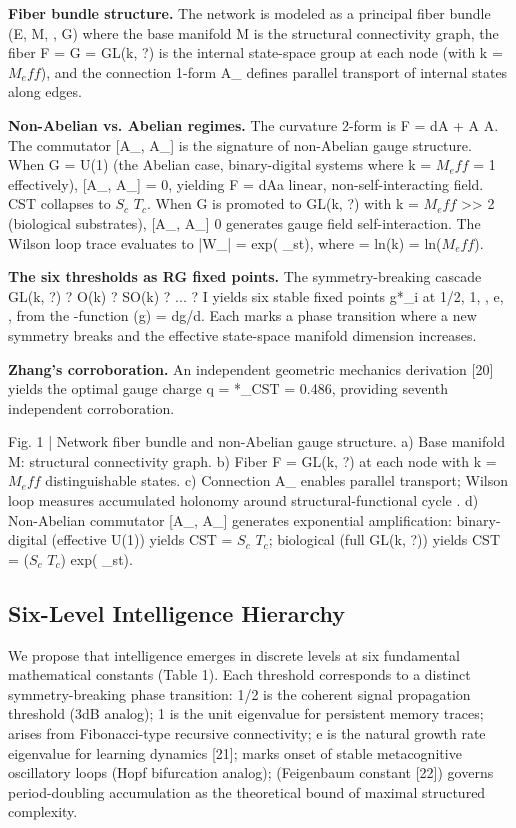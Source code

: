 \documentclass[a4paper,12pt]{article}
\begin{document}
\textbf{Fiber bundle structure.} The network is modeled as a principal fiber bundle (E, M, , G) where the base manifold M is the structural connectivity graph, the fiber F = G = GL(k, ?) is the internal state-space group at each node (with k = $M_eff$), and the connection 1-form A_ defines parallel transport of internal states along edges.


\textbf{Non-Abelian vs. Abelian regimes.} The curvature 2-form is F = dA + A  A. The commutator [A_, A_] is the signature of non-Abelian gauge structure. When G = U(1) (the Abelian case, binary-digital systems where k = $M_eff$ = 1 effectively), [A_, A_] = 0, yielding F = dAa linear, non-self-interacting field. CST collapses to $S_c$  $T_c$. When G is promoted to GL(k, ?) with k = $M_eff$ >> 2 (biological substrates), [A_, A_]  0 generates gauge field self-interaction. The Wilson loop trace evaluates to |W_| = exp(  _st), where  = ln(k) = ln($M_eff$).


\textbf{The six thresholds as RG fixed points.} The symmetry-breaking cascade GL(k, ?) ? O(k) ? SO(k) ? ... ? {I} yields six stable fixed points g*_i at {1/2, 1, , e, , } from the -function (g) =  dg/d. Each marks a phase transition where a new symmetry breaks and the effective state-space manifold dimension increases.


\textbf{Zhang's corroboration.} An independent geometric mechanics derivation [20] yields the optimal gauge charge q = *_CST = 0.486, providing seventh independent corroboration.





Fig. 1 | Network fiber bundle and non-Abelian gauge structure. a) Base manifold M: structural connectivity graph. b) Fiber F = GL(k, ?) at each node with k = $M_eff$ distinguishable states. c) Connection A_ enables parallel transport; Wilson loop measures accumulated holonomy around structural-functional cycle . d) Non-Abelian commutator [A_, A_] generates exponential amplification: binary-digital (effective U(1)) yields CST = $S_c$  $T_c$; biological (full GL(k, ?)) yields CST = ($S_c$  $T_c$)  exp(  _st).



\subsection{Six-Level Intelligence Hierarchy}

We propose that intelligence emerges in discrete levels at six fundamental mathematical constants (Table 1). Each threshold corresponds to a distinct symmetry-breaking phase transition: 1/2 is the coherent signal propagation threshold (3dB analog); 1 is the unit eigenvalue for persistent memory traces;  arises from Fibonacci-type recursive connectivity; e is the natural growth rate eigenvalue for learning dynamics [21];  marks onset of stable metacognitive oscillatory loops (Hopf bifurcation analog);  (Feigenbaum constant [22]) governs period-doubling accumulation as the theoretical bound of maximal structured complexity.
\end{document}
